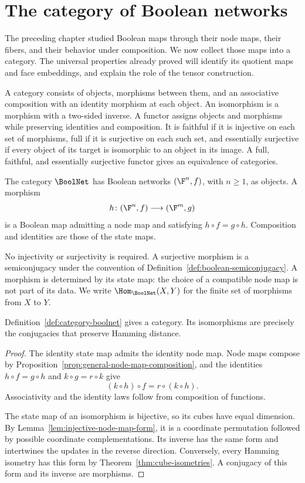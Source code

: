 \section{The category of Boolean networks}\label{sec:category-boolnet}

The preceding chapter studied Boolean maps through their node maps, their fibers, and their behavior under composition. We now collect those maps into a category. The universal properties already proved will identify its quotient maps and face embeddings, and explain the role of the tensor construction.

A category consists of objects, morphisms between them, and an associative composition with an identity morphism at each object. An isomorphism is a morphism with a two-sided inverse. A functor assigns objects and morphisms while preserving identities and composition. It is faithful if it is injective on each set of morphisms, full if it is surjective on each such set, and essentially surjective if every object of its target is isomorphic to an object in its image. A full, faithful, and essentially surjective functor gives an equivalence of categories.

\begin{definition}\label{def:category-boolnet}
The category $\BoolNet$ has Boolean networks $(\F^n,f)$, with $n\geq1$, as objects. A morphism
\[
    h\colon(\F^n,f)\longrightarrow(\F^m,g)
\]
is a Boolean map admitting a node map and satisfying $h\circ f=g\circ h$. Composition and identities are those of the state maps.
\end{definition}

No injectivity or surjectivity is required. A surjective morphism is a semiconjugacy under the convention of Definition~\ref{def:boolean-semiconjugacy}. A morphism is determined by its state map: the choice of a compatible node map is not part of its data. We write $\Hom_{\BoolNet}(X,Y)$ for the finite set of morphisms from $X$ to $Y$.

\begin{proposition}\label{prop:category-isomorphisms}
Definition~\ref{def:category-boolnet} gives a category. Its isomorphisms are precisely the conjugacies that preserve Hamming distance.
\end{proposition}

\begin{proof}
The identity state map admits the identity node map. Node maps compose by Proposition~\ref{prop:general-node-map-composition}, and the identities $h\circ f=g\circ h$ and $k\circ g=r\circ k$ give
\[
    (k\circ h)\circ f=r\circ(k\circ h).
\]
Associativity and the identity laws follow from composition of functions.

The state map of an isomorphism is bijective, so its cubes have equal dimension. By Lemma~\ref{lem:injective-node-map-form}, it is a coordinate permutation followed by possible coordinate complementations. Its inverse has the same form and intertwines the updates in the reverse direction. Conversely, every Hamming isometry has this form by Theorem~\ref{thm:cube-isometries}. A conjugacy of this form and its inverse are morphisms.
\end{proof}

